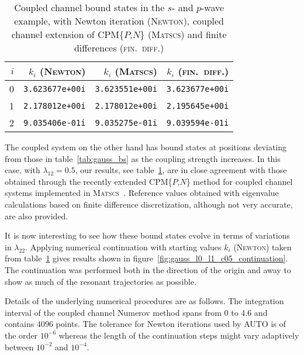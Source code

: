 \documentclass[mathpazo]{cicp}
\begin{document}
\begin{table}[h!]
	\centering
	\begin{tabular}{r|r|r|r}
		$i$ & $k_{i}$ (\textsc{Newton}) & $k_{i}$ (\textsc{Matscs}) & $k_{i}$ (\textsc{fin.\ diff.}) \\
		\hline
		0 & \texttt{3.623677e+00i} & \texttt{3.623551e+00i} & \texttt{3.623677e+00i} \\
		1 & \texttt{2.178012e+00i} & \texttt{2.178012e+00i} & \texttt{2.195645e+00i} \\
		2 & \texttt{9.035406e-01i} & \texttt{9.035275e-01i} & \texttt{9.039594e-01i}
	\end{tabular}
	\caption{Coupled channel bound states in the $s$- and $p$-wave example, with Newton iteration (\textsc{Newton}), 
			coupled channel extension of CPM\{$P$,$N$\} (\textsc{Matscs}) and finite differences (\textsc{fin.\ diff.})}
	\label{tab:gauss_l0_l1_c05_bs}
\end{table}
The coupled system on the other hand has bound states at positions deviating from those in table~\ref{tab:gauss_bs} as the coupling strength increases. In this case, with $\lambda_{12} = 0.5$, our results, see table~\ref{tab:gauss_l0_l1_c05_bs}, are in close agreement with 
those obtained through the recently extended CPM\{$P$,$N$\} method for coupled channel systems \cite{Ledoux2006,Ledoux2007} 
implemented in \textsc{Matscs}~\cite{Matscs}. Reference values obtained with eigenvalue calculations based on finite difference discretization, 
although not very accurate, are also provided.

It is now interesting to see how these bound states evolve in terms of variations in $\lambda_{22}$. Applying numerical continuation with 
starting values $k_{i}$ (\textsc{Newton}) taken from table~\ref{tab:gauss_l0_l1_c05_bs} gives results shown in figure~\ref{fig:gauss_l0_l1_c05_continuation}. 
The continuation was performed both in the direction of the origin and away to show as much of the resonant trajectories as possible.

Details of the underlying numerical procedures are as follows. The integration interval of the coupled channel Numerov method spans from 0 to 4.6 and 
contains 4096 points. The tolerance for Newton iterations used by AUTO is of the order $10^{-6}$ whereas the length of the continuation steps might vary adaptively between $10^{-2}$ and $10^{-4}$.
\end{document}
